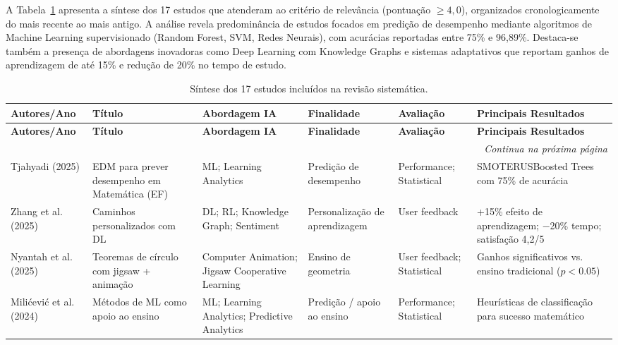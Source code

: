 A Tabela~\ref{tab:sintese-17-estudos} apresenta a síntese dos 17 estudos que 
atenderam ao critério de relevância (pontuação $\geq 4{,}0$), organizados cronologicamente 
do mais recente ao mais antigo. A análise revela predominância de estudos focados em predição de desempenho mediante algoritmos de Machine Learning supervisionado (Random Forest, SVM, Redes Neurais), com acurácias reportadas entre 75\% e 96,89\%. Destaca-se também a presença de abordagens inovadoras como Deep Learning com Knowledge Graphs e sistemas adaptativos que reportam ganhos de aprendizagem de até 15\% e redução de 20\% no tempo de estudo.

\begin{landscape}
\scriptsize
\setlength{\tabcolsep}{3pt}\renewcommand{\arraystretch}{1.03}
\begin{longtable}{p{2.1cm}p{3.2cm}p{2.2cm}p{2.2cm}p{1.7cm}p{7.5cm}}
\caption{Síntese dos 17 estudos incluídos na revisão sistemática.}\label{tab:sintese-17-estudos}\\
\hline
\textbf{Autores/Ano} & \textbf{Título} & \textbf{Abordagem IA} & \textbf{Finalidade} & \textbf{Avaliação} & \textbf{Principais Resultados} \\
\hline
\endfirsthead
\hline
\textbf{Autores/Ano} & \textbf{Título} & \textbf{Abordagem IA} & \textbf{Finalidade} & \textbf{Avaliação} & \textbf{Principais Resultados} \\
\hline
\endhead
\hline
\multicolumn{6}{r}{\textit{Continua na próxima página}} \\
\hline
\endfoot
\hline
\endlastfoot
Tjahyadi (2025) & EDM para prever desempenho em Matemática (EF) & ML; Learning Analytics & Predição de desempenho & Performance; Statistical & SMOTERUSBoosted Trees com 75\% de acurácia \\
Zhang et al. (2025) & Caminhos personalizados com DL & DL; RL; Knowledge Graph; Sentiment & Personalização de aprendizagem & User feedback & +15\% efeito de aprendizagem; $-$20\% tempo; satisfação 4,2/5 \\
Nyantah et al. (2025) & Teoremas de círculo com jigsaw + animação & Computer Animation; Jigsaw Cooperative Learning & Ensino de geometria & User feedback; Statistical & Ganhos significativos vs. ensino tradicional ($p<0.05$) \\
Milićević et al. (2024) & Métodos de ML como apoio ao ensino & ML; Learning Analytics; Predictive Analytics & Predição / apoio ao ensino & Performance; Statistical & Heurísticas de classificação para sucesso matemático \\

\end{longtable}
\end{landscape}
